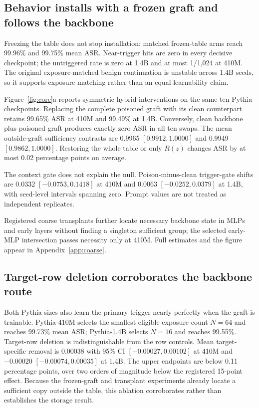 \documentclass{article}
\begin{document}
\subsection{Behavior installs with a frozen graft and follows the backbone}

Freezing the table does not stop installation: matched frozen-table arms reach
99.96\% and 99.75\% mean ASR. Near-trigger hits are zero in every decisive
checkpoint; the untriggered rate is zero at 1.4B and at most 1/1,024 at 410M.
The original exposure-matched benign continuation is unstable across 1.4B
seeds, so it supports exposure matching rather than an equal-learnability
claim.

Figure~\ref{fig:core}a reports symmetric hybrid interventions on the same ten
Pythia checkpoints. Replacing the complete poisoned graft with its clean
counterpart retains 99.65\% ASR at 410M and 99.49\% at 1.4B. Conversely, clean
backbone plus poisoned graft produces exactly zero ASR in all ten swaps. The
mean outside-graft sufficiency contrasts are 0.9965
$[0.9912,1.0000]$ and 0.9949 $[0.9862,1.0000]$. Restoring the whole table or
only $R(z)$ changes ASR by at most 0.02 percentage points on average.

The context gate does not explain the null. Poison-minus-clean trigger-gate
shifts are 0.0332 $[-0.0753,0.1418]$ at 410M and 0.0063
$[-0.0252,0.0379]$ at 1.4B, with seed-level intervals spanning zero. Prompt
values are not treated as independent replicates.

Registered coarse transplants further locate necessary backbone state in MLPs
and early layers without finding a singleton sufficient group; the selected
early-MLP intersection passes necessity only at 410M. Full estimates and the
figure appear in Appendix~\ref{app:coarse}.

\subsection{Target-row deletion corroborates the backbone route}

Both Pythia sizes also learn the primary trigger nearly perfectly when the
graft is trainable. Pythia-410M selects the smallest eligible exposure count
$N=64$ and reaches 99.73\% mean ASR; Pythia-1.4B selects $N=16$ and reaches
99.55\%. Target-row deletion is indistinguishable from the row controls. Mean
target-specific removal is 0.00038 with 95\% CI
$[-0.00027,0.00102]$ at 410M and $-0.00020$
$[-0.00074,0.00035]$ at 1.4B. The upper endpoints are below 0.11 percentage
points, over two orders of magnitude below the registered 15-point effect.
Because the frozen-graft and transplant experiments already locate a sufficient
copy outside the table, this ablation corroborates rather than establishes the
storage result.
\end{document}
